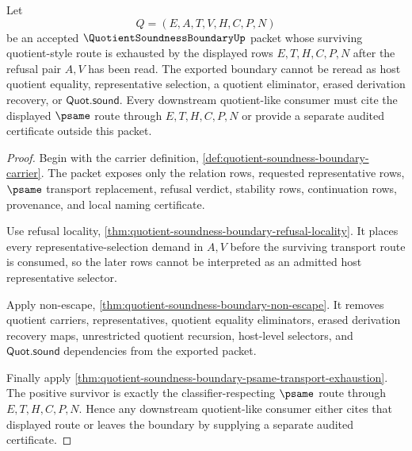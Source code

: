 \begin{theorem}
\label{thm:quotient-soundness-boundary-core-refusal-host-quotient-exclusion}
Let
$$
Q=(E,A,T,V,H,C,P,N)
$$
be an accepted $\QuotientSoundnessBoundaryUp$ packet whose surviving
quotient-style route is exhausted by the displayed rows $E,T,H,C,P,N$ after
the refusal pair $A,V$ has been read. The exported boundary cannot be reread
as host quotient equality, representative selection, a quotient eliminator,
erased derivation recovery, or $\mathsf{Quot.sound}$. Every downstream
quotient-like consumer must cite the displayed $\psame$ route through
$E,T,H,C,P,N$ or provide a separate audited certificate outside this packet.
\end{theorem}
\begin{proof}
Begin with the carrier definition,
\autoref{def:quotient-soundness-boundary-carrier}. The packet exposes only
the relation rows, requested representative rows, $\psame$ transport
replacement, refusal verdict, stability rows, continuation rows, provenance,
and local naming certificate.

Use refusal locality,
\autoref{thm:quotient-soundness-boundary-refusal-locality}. It places every
representative-selection demand in $A,V$ before the surviving transport route
is consumed, so the later rows cannot be interpreted as an admitted host
representative selector.

Apply non-escape,
\autoref{thm:quotient-soundness-boundary-non-escape}. It removes quotient
carriers, representatives, quotient equality eliminators, erased derivation
recovery maps, unrestricted quotient recursion, host-level selectors, and
$\mathsf{Quot.sound}$ dependencies from the exported packet.

Finally apply
\autoref{thm:quotient-soundness-boundary-psame-transport-exhaustion}. The
positive survivor is exactly the classifier-respecting $\psame$ route through
$E,T,H,C,P,N$. Hence any downstream quotient-like consumer either cites that
displayed route or leaves the boundary by supplying a separate audited
certificate.
\end{proof}

